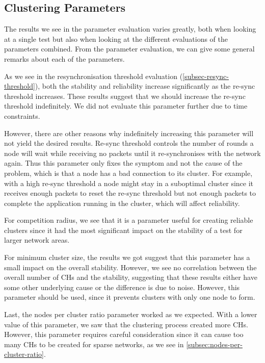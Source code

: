 \subsection{Clustering Parameters}
\label{discussion:clustering-parameters}
The results we see in the parameter evaluation varies greatly, both when looking at a single test but also when looking at the different evaluations of the parameters combined. From the parameter evaluation, we can give some general remarks about each of the parameters.

\begin{newtext}
As we see in the resynchronisation threshold evaluation (\cref{subsec-resync-threshold}), both the stability and reliability increase significantly as the re-sync threshold increases. These results suggest that we should increase the re-sync threshold indefinitely. We did not evaluate this parameter further due to time constraints.


However, there are other reasons why indefinitely increasing this parameter will not yield the desired results. Re-sync threshold controls the number of rounds a node will wait while receiving no packets until it re-synchronises with the network again. Thus this parameter only fixes the symptom and not the cause of the problem, which is that a node has a bad connection to its cluster. For example, with a high re-sync threshold a node might stay in a suboptimal cluster since it receives enough packets to reset the re-sync threshold but not enough packets to complete the application running in the cluster, which will affect reliability.
\end{newtext}


For competition radius, we see that it is a parameter useful for creating reliable clusters since it had the most significant impact on the stability of a test for larger network areas.

For minimum cluster size, the results we got suggest that this parameter has a small impact on the overall stability. However, we see no correlation between the overall number of CHs and the stability, suggesting that these results either have some other underlying cause or the difference is due to noise. However, this parameter should be used, since it prevents clusters with only one node to form.

Last, the nodes per cluster ratio parameter worked as we expected. With a lower value of this parameter, we saw that the clustering process created more CHs. However, this parameter requires careful consideration since it can cause too many CHs to be created for sparse networks, as we see in \cref{subsec:nodes-per-cluster-ratio}.

